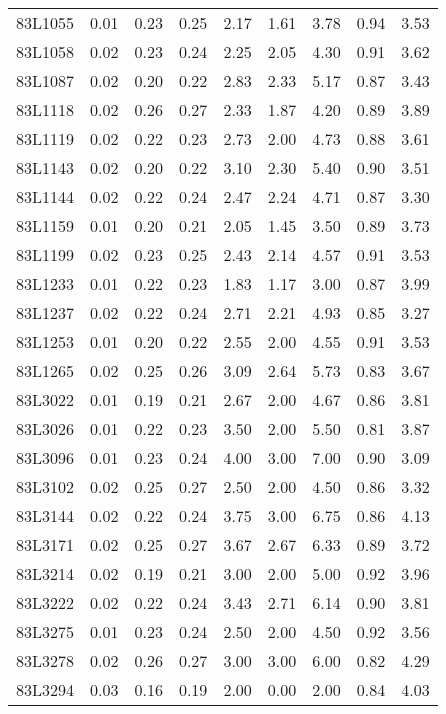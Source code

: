 \begin{center}
\begin{longtable}{|p{0.6in}|p{0.5in}|p{0.5in}|p{0.5in}|p{0.5in}|p{0.5in}|p{0.5in}|p{0.5in}|p{0.5in}|}
 83L1055 & 0.01 & 0.23 & 0.25 & 2.17 & 1.61 & 3.78 & 0.94 & 3.53 \\ 
 83L1058 & 0.02 & 0.23 & 0.24 & 2.25 & 2.05 & 4.30 & 0.91 & 3.62 \\ 
 83L1087 & 0.02 & 0.20 & 0.22 & 2.83 & 2.33 & 5.17 & 0.87 & 3.43 \\ 
 83L1118 & 0.02 & 0.26 & 0.27 & 2.33 & 1.87 & 4.20 & 0.89 & 3.89 \\ 
 83L1119 & 0.02 & 0.22 & 0.23 & 2.73 & 2.00 & 4.73 & 0.88 & 3.61 \\ 
 83L1143 & 0.02 & 0.20 & 0.22 & 3.10 & 2.30 & 5.40 & 0.90 & 3.51 \\ 
 83L1144 & 0.02 & 0.22 & 0.24 & 2.47 & 2.24 & 4.71 & 0.87 & 3.30 \\ 
 83L1159 & 0.01 & 0.20 & 0.21 & 2.05 & 1.45 & 3.50 & 0.89 & 3.73 \\ 
 83L1199 & 0.02 & 0.23 & 0.25 & 2.43 & 2.14 & 4.57 & 0.91 & 3.53 \\ 
 83L1233 & 0.01 & 0.22 & 0.23 & 1.83 & 1.17 & 3.00 & 0.87 & 3.99 \\ 
 83L1237 & 0.02 & 0.22 & 0.24 & 2.71 & 2.21 & 4.93 & 0.85 & 3.27 \\ 
 83L1253 & 0.01 & 0.20 & 0.22 & 2.55 & 2.00 & 4.55 & 0.91 & 3.53 \\ 
 83L1265 & 0.02 & 0.25 & 0.26 & 3.09 & 2.64 & 5.73 & 0.83 & 3.67 \\ 
 83L3022 & 0.01 & 0.19 & 0.21 & 2.67 & 2.00 & 4.67 & 0.86 & 3.81 \\ 
 83L3026 & 0.01 & 0.22 & 0.23 & 3.50 & 2.00 & 5.50 & 0.81 & 3.87 \\ 
 83L3096 & 0.01 & 0.23 & 0.24 & 4.00 & 3.00 & 7.00 & 0.90 & 3.09 \\ 
 83L3102 & 0.02 & 0.25 & 0.27 & 2.50 & 2.00 & 4.50 & 0.86 & 3.32 \\ 
 83L3144 & 0.02 & 0.22 & 0.24 & 3.75 & 3.00 & 6.75 & 0.86 & 4.13 \\ 
 83L3171 & 0.02 & 0.25 & 0.27 & 3.67 & 2.67 & 6.33 & 0.89 & 3.72 \\ 
 83L3214 & 0.02 & 0.19 & 0.21 & 3.00 & 2.00 & 5.00 & 0.92 & 3.96 \\ 
 83L3222 & 0.02 & 0.22 & 0.24 & 3.43 & 2.71 & 6.14 & 0.90 & 3.81 \\ 
 83L3275 & 0.01 & 0.23 & 0.24 & 2.50 & 2.00 & 4.50 & 0.92 & 3.56 \\ 
 83L3278 & 0.02 & 0.26 & 0.27 & 3.00 & 3.00 & 6.00 & 0.82 & 4.29 \\ 
 83L3294 & 0.03 & 0.16 & 0.19 & 2.00 & 0.00 & 2.00 & 0.84 & 4.03 \\ 

\end{longtable}
\end{center}
